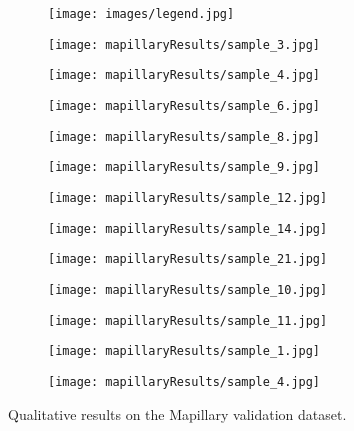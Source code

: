 \documentclass[runningheads]{llncs}
\begin{document}
\begin{figure}[h!]
\begin{subfigure}[b]{\columnwidth}
\texttt{[image: images/legend.jpg]}
\end{subfigure}
\begin{subfigure}[b]{\columnwidth}
\texttt{[image: mapillaryResults/sample\_3.jpg]}
\end{subfigure}
\begin{subfigure}[b]{\columnwidth}
\texttt{[image: mapillaryResults/sample\_4.jpg]}
\end{subfigure}
\begin{subfigure}[b]{\columnwidth}
\texttt{[image: mapillaryResults/sample\_6.jpg]}
\end{subfigure}
\begin{subfigure}[b]{\columnwidth}
\texttt{[image: mapillaryResults/sample\_8.jpg]}
\end{subfigure}
\begin{subfigure}[b]{\columnwidth}
\texttt{[image: mapillaryResults/sample\_9.jpg]}
\end{subfigure}
\begin{subfigure}[b]{\columnwidth}
\texttt{[image: mapillaryResults/sample\_12.jpg]}
\end{subfigure}
\begin{subfigure}[b]{\columnwidth}
\texttt{[image: mapillaryResults/sample\_14.jpg]}
\end{subfigure}
\begin{subfigure}[b]{\columnwidth}
\texttt{[image: mapillaryResults/sample\_21.jpg]}
\end{subfigure}
\begin{subfigure}[b]{\columnwidth}
\texttt{[image: mapillaryResults/sample\_10.jpg]}
\end{subfigure}
\begin{subfigure}[b]{\columnwidth}
\texttt{[image: mapillaryResults/sample\_11.jpg]}
\end{subfigure}
\begin{subfigure}[b]{\columnwidth}
\texttt{[image: mapillaryResults/sample\_1.jpg]}
\end{subfigure}
\begin{subfigure}[b]{\columnwidth}
\texttt{[image: mapillaryResults/sample\_4.jpg]}
\end{subfigure}
\caption{Qualitative results on the Mapillary validation dataset.}
\label{fig:mapResultsSupp}
\end{figure}
\end{document}

